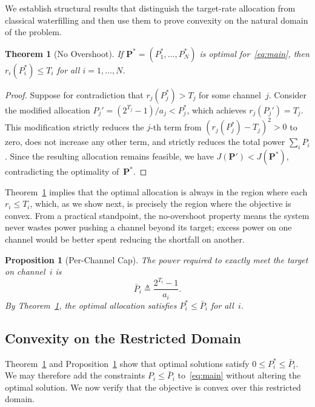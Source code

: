 \documentclass[journal]{IEEEtran}
\newtheorem{theorem}{Theorem}
\newtheorem{proposition}{Proposition}
\begin{document}
We establish structural results that distinguish the target-rate allocation from classical waterfilling and then use them to prove convexity on the natural domain of the problem.

\begin{theorem}[No Overshoot]
\label{thm:noovershoot}
If $\bm{P}^* = (P_1^*,\ldots,P_N^*)$ is optimal for~\eqref{eq:main}, then $r_i(P_i^*) \le T_i$ for all $i = 1,\ldots,N$.
\end{theorem}

\begin{proof}
Suppose for contradiction that $r_j(P_j^*) > T_j$ for some channel~$j$.
Consider the modified allocation $P_j' = (2^{T_j} - 1)/a_j < P_j^*$, which achieves $r_j(P_j') = T_j$.
This modification strictly reduces the $j$-th term from $(r_j(P_j^*) - T_j)^2 > 0$ to zero, does not increase any other term, and strictly reduces the total power $\sum_i P_i$.
Since the resulting allocation remains feasible, we have $J(\bm{P}') < J(\bm{P}^*)$, contradicting the optimality of~$\bm{P}^*$.
\end{proof}

Theorem~\ref{thm:noovershoot} implies that the optimal allocation is always in the region where each $r_i \le T_i$, which, as we show next, is precisely the region where the objective is convex.
From a practical standpoint, the no-overshoot property means the system never wastes power pushing a channel beyond its target; excess power on one channel would be better spent reducing the shortfall on another.

\begin{proposition}[Per-Channel Cap]
\label{prop:cap}
The power required to exactly meet the target on channel~$i$ is
\begin{equation}
\bar{P}_i \triangleq \frac{2^{T_i} - 1}{a_i}.
\label{eq:cap}
\end{equation}
By Theorem~\ref{thm:noovershoot}, the optimal allocation satisfies $P_i^* \le \bar{P}_i$ for all~$i$.
\end{proposition}

\subsection{Convexity on the Restricted Domain}

Theorem~\ref{thm:noovershoot} and Proposition~\ref{prop:cap} show that optimal solutions satisfy $0 \le P_i^* \le \bar{P}_i$.
We may therefore add the constraints $P_i \le \bar{P}_i$ to~\eqref{eq:main} without altering the optimal solution.
We now verify that the objective is convex over this restricted domain.
\end{document}
